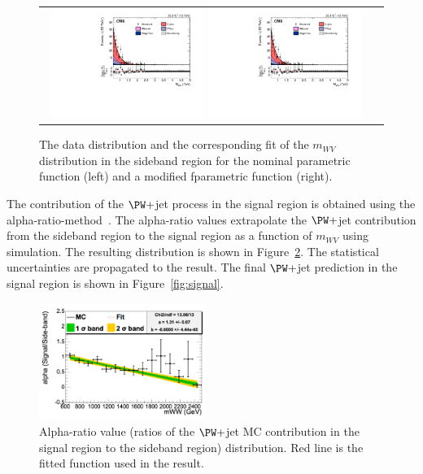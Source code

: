 \begin{figure}[htbp] 
	 \centering 
	 \begin{tabular}{cc}
	 \includegraphics[width=0.48\textwidth]{Plots/BackgroundEstimation/WV/m_lvj_fitting/m_lvj_sb_lo_WJets0_xww__with_pull.pdf}
	 \includegraphics[width=0.48\textwidth]{Plots/BackgroundEstimation/WV/m_lvj_fitting/m_lvj_sb_lo_WJets01_xww__with_pull.pdf} 
	 \end{tabular}
	 \caption{The data distribution and the corresponding fit of the $m_{WV}$ distribution in the sideband region for the nominal parametric function (left) and a modified fparametric function (right).}
	 \label{fig:DataMCForMWW}
\end{figure}

 The contribution of the $\PW+$jet process in the signal region is obtained using the alpha-ratio-method~\cite{resonances,cmsnote}. The alpha-ratio values extrapolate the $\PW+$jet contribution from the sideband region to the signal region as a function of $m_{WV}$ using simulation. The resulting distribution is shown in Figure~\ref{fig:AlphaDis}. The statistical uncertainties are propagated to the result. The final $\PW+$jet prediction in the signal region is shown in Figure~\ref{fig:signal}. 

\begin{figure}[htbp] 
	 \centering 
	 \includegraphics[width=0.48\textwidth]{Plots/BackgroundEstimation/WV/WVchannel_AlphaDistribution_AfterFit.pdf}
	 \caption{Alpha-ratio value (ratios of the $\PW+$jet MC contribution in the signal region to the sideband region) distribution. Red line is the fitted function used in the result.}
	 \label{fig:AlphaDis}
\end{figure}

